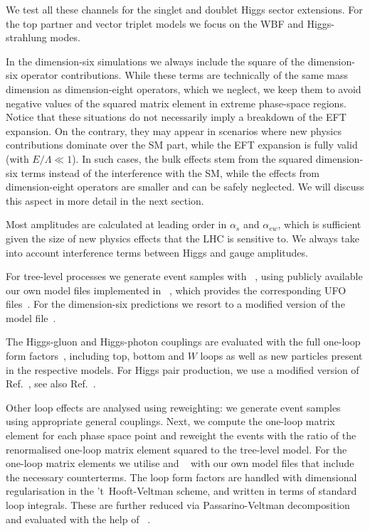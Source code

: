 \newparagraph
%
We test all these channels for the singlet and doublet Higgs sector
extensions. For the top partner and vector triplet models we focus on
the WBF and Higgs-strahlung modes.

In the dimension-six simulations we always include the square of the
dimension-six operator contributions. While these terms are
technically of the same mass dimension as dimension-eight operators,
which we neglect, we keep them to avoid negative values of the squared
matrix element in extreme phase-space regions. Notice that these
situations do not necessarily imply a breakdown of the EFT
expansion. On the contrary, they may appear in scenarios where new
physics contributions dominate over the SM part, while the EFT
expansion is fully valid (with $E/\Lambda \ll 1$). In such cases, the
bulk effects stem from the squared dimension-six terms instead of the
interference with the SM, while the effects from dimension-eight
operators are smaller and can be safely neglected. We will discuss
this aspect in more detail in the next section.

Most amplitudes are calculated at leading order in $\alpha_s$
and $\alpha_{ew}$, which is sufficient given the size of new physics
effects that the LHC is sensitive to. We always take into account
interference terms between Higgs and gauge amplitudes. 

For tree-level processes we generate event samples with
~\cite{Alwall:2014hca}, using publicly available
our own model files implemented in
~\cite{Alloul:2013bka}, which provides the
corresponding UFO files~\cite{Degrande:2011ua}.  For the dimension-six
predictions we resort to a modified version of the 
model file~\cite{Alloul:2013naa}.

The Higgs-gluon and Higgs-photon couplings are evaluated with the full
one-loop form fac\-tors~\cite{Djouadi:2005gi}, including top, bottom and
$W$ loops as well as new particles present in the respective
models. For Higgs pair production, we use a modified version of
Ref.~\cite{higgspaircode}, see also Ref.~\cite{Hespel:2014sla}.

Other loop effects are analysed using reweighting: we generate event
samples using appropriate general couplings. Next, we compute the
one-loop matrix element for each phase space point and reweight the
events with the ratio of the renormalised one-loop matrix element
squared to the tree-level model. For the one-loop matrix elements we
utilise  and ~\cite{Hahn:2000kx}
with our own model files that include the necessary counterterms. The
loop form factors are handled with dimensional regularisation in the
't~Hooft-Veltman scheme, and written in terms of standard loop
integrals. These are further reduced via Passarino-Veltman
decomposition and evaluated with the help of
~\cite{Hahn:1998yk}.

